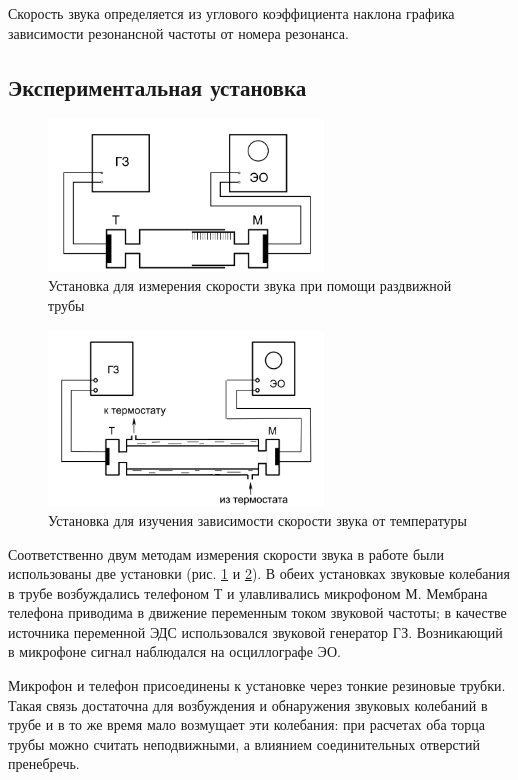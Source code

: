 \documentclass[a4paper,12pt]{article} %
\begin{document}
Скорость звука определяется из углового коэффициента наклона графика зависимости резонансной частоты от номера резонанса.

\subsection{Экспериментальная установка}

\begin{figure}
    \centering
    \includegraphics[width = 0.65\textwidth]{setup1.PNG}
    \caption{Установка для измерения скорости звука при помощи раздвижной трубы}
    \label{fig:setup1}
\end{figure}

\begin{figure}
    \centering
    \includegraphics[width = 0.65\textwidth]{setup2.PNG}
    \caption{Установка для изучения зависимости скорости звука от температуры}
    \label{fig:setup2}
\end{figure}

Соответственно двум методам измерения скорости звука в работе были использованы две установки (рис. \ref{fig:setup1} и \ref{fig:setup2}). В обеих установках звуковые колебания в трубе возбуждались телефоном Т и улавливались микрофоном М. Мембрана телефона приводима в движение переменным током звуковой частоты; в качестве источника переменной ЭДС использовался звуковой генератор ГЗ. Возникающий в микрофоне сигнал наблюдался на осциллографе ЭО.

Микрофон и телефон присоединены к установке через тонкие резиновые трубки. Такая связь достаточна для возбуждения и обнаружения звуковых колебаний в трубе и в то же время мало возмущает эти колебания: при расчетах оба торца трубы можно считать неподвижными, а влиянием соединительных отверстий пренебречь.
\end{document}
